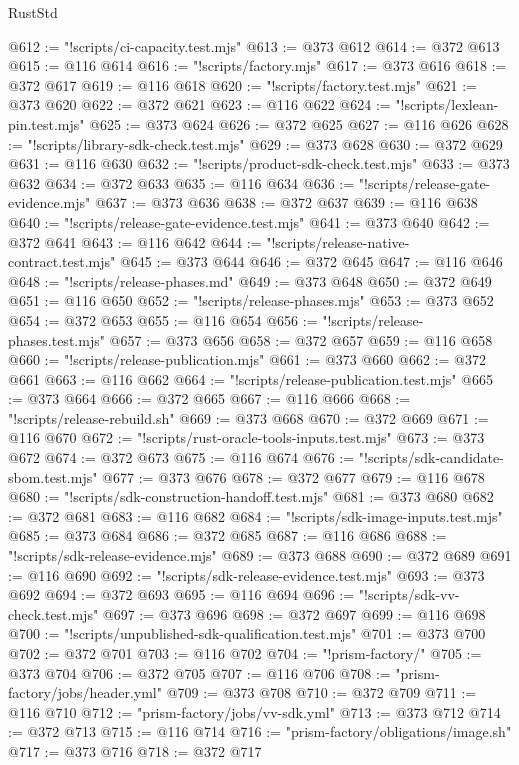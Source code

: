 \begin{lexlean}{RustStd}
\begin{coremodule}
@612 := "!scripts/ci-capacity.test.mjs"
@613 := @373 @612
@614 := @372 @613
@615 := @116 @614
@616 := "!scripts/factory.mjs"
@617 := @373 @616
@618 := @372 @617
@619 := @116 @618
@620 := "!scripts/factory.test.mjs"
@621 := @373 @620
@622 := @372 @621
@623 := @116 @622
@624 := "!scripts/lexlean-pin.test.mjs"
@625 := @373 @624
@626 := @372 @625
@627 := @116 @626
@628 := "!scripts/library-sdk-check.test.mjs"
@629 := @373 @628
@630 := @372 @629
@631 := @116 @630
@632 := "!scripts/product-sdk-check.test.mjs"
@633 := @373 @632
@634 := @372 @633
@635 := @116 @634
@636 := "!scripts/release-gate-evidence.mjs"
@637 := @373 @636
@638 := @372 @637
@639 := @116 @638
@640 := "!scripts/release-gate-evidence.test.mjs"
@641 := @373 @640
@642 := @372 @641
@643 := @116 @642
@644 := "!scripts/release-native-contract.test.mjs"
@645 := @373 @644
@646 := @372 @645
@647 := @116 @646
@648 := "!scripts/release-phases.md"
@649 := @373 @648
@650 := @372 @649
@651 := @116 @650
@652 := "!scripts/release-phases.mjs"
@653 := @373 @652
@654 := @372 @653
@655 := @116 @654
@656 := "!scripts/release-phases.test.mjs"
@657 := @373 @656
@658 := @372 @657
@659 := @116 @658
@660 := "!scripts/release-publication.mjs"
@661 := @373 @660
@662 := @372 @661
@663 := @116 @662
@664 := "!scripts/release-publication.test.mjs"
@665 := @373 @664
@666 := @372 @665
@667 := @116 @666
@668 := "!scripts/release-rebuild.sh"
@669 := @373 @668
@670 := @372 @669
@671 := @116 @670
@672 := "!scripts/rust-oracle-tools-inputs.test.mjs"
@673 := @373 @672
@674 := @372 @673
@675 := @116 @674
@676 := "!scripts/sdk-candidate-sbom.test.mjs"
@677 := @373 @676
@678 := @372 @677
@679 := @116 @678
@680 := "!scripts/sdk-construction-handoff.test.mjs"
@681 := @373 @680
@682 := @372 @681
@683 := @116 @682
@684 := "!scripts/sdk-image-inputs.test.mjs"
@685 := @373 @684
@686 := @372 @685
@687 := @116 @686
@688 := "!scripts/sdk-release-evidence.mjs"
@689 := @373 @688
@690 := @372 @689
@691 := @116 @690
@692 := "!scripts/sdk-release-evidence.test.mjs"
@693 := @373 @692
@694 := @372 @693
@695 := @116 @694
@696 := "!scripts/sdk-vv-check.test.mjs"
@697 := @373 @696
@698 := @372 @697
@699 := @116 @698
@700 := "!scripts/unpublished-sdk-qualification.test.mjs"
@701 := @373 @700
@702 := @372 @701
@703 := @116 @702
@704 := "!prism-factory/"
@705 := @373 @704
@706 := @372 @705
@707 := @116 @706
@708 := "prism-factory/jobs/header.yml"
@709 := @373 @708
@710 := @372 @709
@711 := @116 @710
@712 := "prism-factory/jobs/vv-sdk.yml"
@713 := @373 @712
@714 := @372 @713
@715 := @116 @714
@716 := "prism-factory/obligations/image.sh"
@717 := @373 @716
@718 := @372 @717

\end{coremodule}
\end{lexlean}
